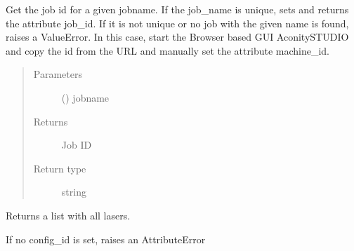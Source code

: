\documentclass[letterpaper,10pt,english,openany,oneside]{sphinxmanual}
\begin{document}
\begin{fulllineitems}
\begin{fulllineitems}
\end{fulllineitems}


\begin{fulllineitems}
\label{\detokenize{_modules/AconitySTUDIO_client:AconitySTUDIO_client.AconitySTUDIO_client.get_job_id}}
Get the job id for a given jobname. If the job\_name is unique, sets and returns the attribute job\_id.
If it is not unique or no job with the given name is found, raises a ValueError.
In this case, start the Browser based GUI AconitySTUDIO and copy the id from the URL and manually set the attribute machine\_id.
\begin{quote}\begin{description}
\item[{Parameters}] \leavevmode
{} () \textendash{} jobname

\item[{Returns}] \leavevmode
Job ID

\item[{Return type}] \leavevmode
string

\end{description}\end{quote}

\end{fulllineitems}


\begin{fulllineitems}
\label{\detokenize{_modules/AconitySTUDIO_client:AconitySTUDIO_client.AconitySTUDIO_client.get_lasers}}
Returns a list with all lasers.

If no config\_id is set, raises an AttributeError

\end{fulllineitems}



\end{fulllineitems}
\end{document}
